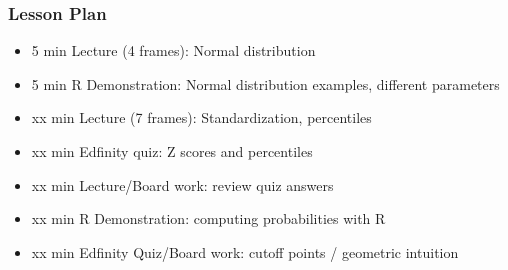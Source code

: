 \begin{frame}
    \frametitle{Lesson Plan}
    \begin{itemize}
        \item 5 min Lecture (4 frames): Normal distribution
        \item 5 min R Demonstration: Normal distribution examples, different parameters
        \item xx min Lecture (7 frames): Standardization, percentiles
        \item xx min Edfinity quiz: Z scores and percentiles
        \item xx min Lecture/Board work: review quiz answers
        \item xx min R Demonstration: computing probabilities with R
        \item xx min Edfinity Quiz/Board work: cutoff points / geometric intuition
    \end{itemize}
\end{frame}


